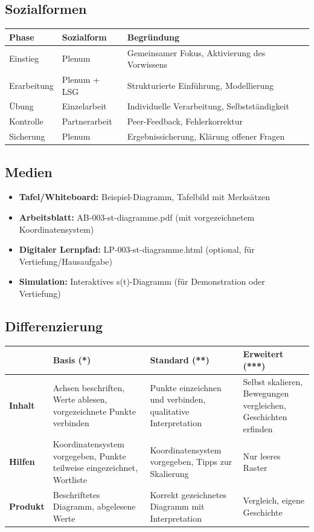 \documentclass[11pt,a4paper]{article}
\begin{document}
\subsection{Sozialformen}
\begin{tabular}{|l|l|l|}
\hline
\textbf{Phase} & \textbf{Sozialform} & \textbf{Begründung} \\
\hline
Einstieg & Plenum & Gemeinsamer Fokus, Aktivierung des Vorwissens \\
\hline
Erarbeitung & Plenum + LSG & Strukturierte Einführung, Modellierung \\
\hline
Übung & Einzelarbeit & Individuelle Verarbeitung, Selbstständigkeit \\
\hline
Kontrolle & Partnerarbeit & Peer-Feedback, Fehlerkorrektur \\
\hline
Sicherung & Plenum & Ergebnissicherung, Klärung offener Fragen \\
\hline
\end{tabular}

\subsection{Medien}
\begin{itemize}
    \item \textbf{Tafel/Whiteboard:} Beispiel-Diagramm, Tafelbild mit Merksätzen
    \item \textbf{Arbeitsblatt:} AB-003-st-diagramme.pdf (mit vorgezeichnetem Koordinatensystem)
    \item \textbf{Digitaler Lernpfad:} LP-003-st-diagramme.html (optional, für Vertiefung/Hausaufgabe)
    \item \textbf{Simulation:} Interaktives s(t)-Diagramm (für Demonstration oder Vertiefung)
\end{itemize}

\subsection{Differenzierung}
\begin{tabular}{|l|p{3.3cm}|p{3.3cm}|p{3.3cm}|}
\hline
& \textbf{Basis (*)} & \textbf{Standard (**)} & \textbf{Erweitert (***)} \\
\hline
\textbf{Inhalt} & Achsen beschriften, Werte ablesen, vorgezeichnete Punkte verbinden & Punkte einzeichnen und verbinden, qualitative Interpretation & Selbst skalieren, Bewegungen vergleichen, Geschichten erfinden \\
\hline
\textbf{Hilfen} & Koordinatensystem vorgegeben, Punkte teilweise eingezeichnet, Wortliste & Koordinatensystem vorgegeben, Tipps zur Skalierung & Nur leeres Raster \\
\hline
\textbf{Produkt} & Beschriftetes Diagramm, abgelesene Werte & Korrekt gezeichnetes Diagramm mit Interpretation & Vergleich, eigene Geschichte \\
\hline
\end{tabular}
\end{document}

